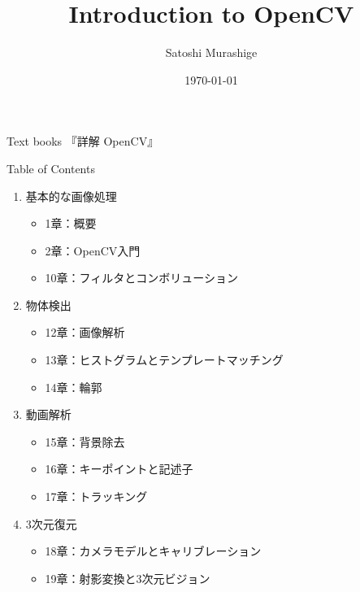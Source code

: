 \documentclass[10pt]{beamer}
\title{Introduction to OpenCV}
\date{\today}
\author{Satoshi Murashige}
\institute{Mathematical Informatics Lab., NAIST}
\newcommand{\myinsertlogo}[1]{%
\begin{tikzpicture}[overlay, remember picture]
    \node[above left=1cm and .8cm of current page.south east] {\texttt{[image: \#1]}};
\end{tikzpicture}}
\begin{document}
	\begin{frame}[plain]
		\maketitle
	\end{frame}
	\begin{frame}{Text books}
		『詳解 OpenCV』
	\end{frame}
	\begin{frame}{Table of Contents}
		\begin{enumerate}
			\item 基本的な画像処理
				\begin{itemize}
					\item 1章：概要
					\item 2章：OpenCV入門
					\item 10章：フィルタとコンボリューション
				\end{itemize}
			\item 物体検出
				\begin{itemize}
					\item 12章：画像解析
					\item 13章：ヒストグラムとテンプレートマッチング
					\item 14章：輪郭
				\end{itemize}
			\item 動画解析
				\begin{itemize}
					\item 15章：背景除去
					\item 16章：キーポイントと記述子
					\item 17章：トラッキング
				\end{itemize}
			\item 3次元復元
				\begin{itemize}
					\item 18章：カメラモデルとキャリブレーション
					\item 19章：射影変換と3次元ビジョン
				\end{itemize}
		\end{enumerate}
	\end{frame}
\end{document}
